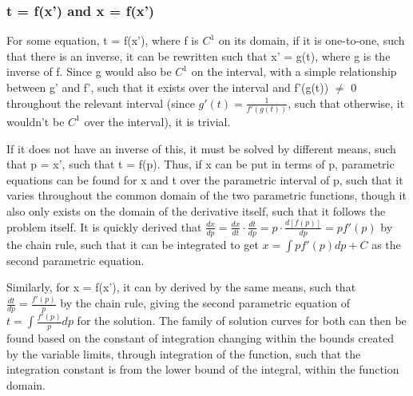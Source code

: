 \documentclass[11 pt, twoside]{article}
\begin{document}
\subsubsection*{t = f(x') and x = f(x')}
For some equation, t = f(x'), where f is $C^1$ on its domain, if it is one-to-one, such that there is an inverse, it can be rewritten such that x' = g(t), where g is the inverse of f. Since g would also be $C^1$ on the interval, with a simple relationship between g' and f', such that it exists over the interval and f'(g(t)) $\neq$ 0 throughout the relevant interval (since $g'(t) = \frac{1}{f'(g(t))}$, such that otherwise, it wouldn't be $C^1$ over the interval), it is trivial.

If it does not have an inverse of this, it must be solved by different means, such that p = x', such that t = f(p). Thus, if x can be put in terms of p, parametric equations can be found for x and t over the parametric interval of p, such that it varies throughout the common domain of the two parametric functions, though it also only exists on the domain of the derivative itself, such that it follows the problem itself. It is quickly derived that $\frac{dx}{dp} = \frac{dx}{dt} \cdot \frac{dt}{dp} = p \cdot \frac{d[f(p)]}{dp} = pf'(p)$ by the chain rule, such that it can be integrated to get $x = \int pf'(p)dp + C$ as the second parametric equation. 

Similarly, for x = f(x'), it can by derived by the same means, such that $\frac{dt}{dp} = \frac{f'(p)}{p}$ by the chain rule, giving the second parametric equation of $t = \int \frac{f'(p)}{p}dp$ for the solution. The family of solution curves for both can then be found based on the constant of integration changing within the bounds created by the variable limits, through integration of the function, such that the integration constant is from the lower bound of the integral, within the function domain.
\end{document}

